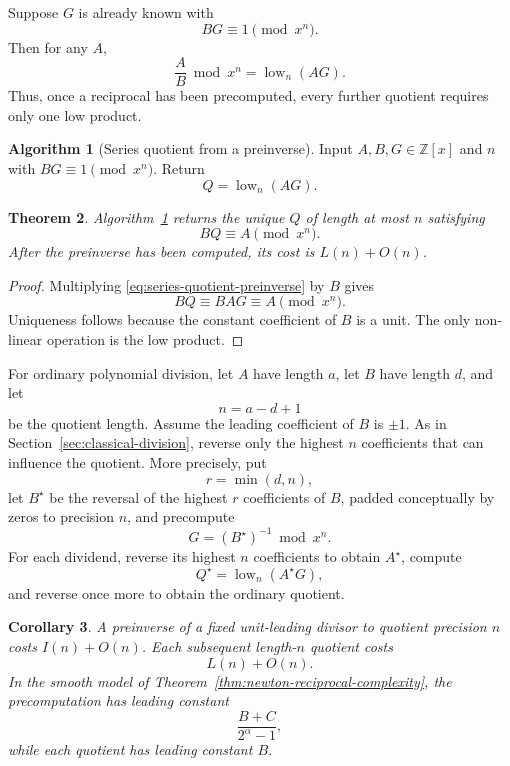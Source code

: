 \documentclass[11pt]{book}
\newtheorem{theorem}{Theorem}[section]
\newtheorem{corollary}[theorem]{Corollary}
\theoremstyle{definition}
\newtheorem{algorithm}[theorem]{Algorithm}
\newcommand{\ZZ}{\mathbb Z}
\begin{document}
Suppose $G$ is already known with
\[
 BG\equiv1\pmod{x^n}.
\]
Then for any $A$,
\begin{equation}\label{eq:series-quotient-preinverse}
 \frac AB\bmod x^n
 =\operatorname{low}_n(AG).
\end{equation}
Thus, once a reciprocal has been precomputed, every further quotient requires
only one low product.

\begin{algorithm}[Series quotient from a preinverse]\label{alg:series-preinverse}
Input $A,B,G\in\ZZ[x]$ and $n$ with $BG\equiv1\pmod{x^n}$.
Return
\[
 Q=\operatorname{low}_n(AG).
\]
\end{algorithm}

\begin{theorem}\label{thm:series-preinverse-correctness}
Algorithm~\ref{alg:series-preinverse} returns the unique $Q$ of length at most
$n$ satisfying
\[
 BQ\equiv A\pmod{x^n}.
\]
After the preinverse has been computed, its cost is $L(n)+O(n)$.
\end{theorem}

\begin{proof}
Multiplying \eqref{eq:series-quotient-preinverse} by $B$ gives
\[
 BQ\equiv BAG\equiv A\pmod{x^n}.
\]
Uniqueness follows because the constant coefficient of $B$ is a unit.  The
only non-linear operation is the low product.
\end{proof}

For ordinary polynomial division, let $A$ have length $a$, let $B$ have length
$d$, and let
\[
 n=a-d+1
\]
be the quotient length.  Assume the leading coefficient of $B$ is $\pm1$.
As in Section~\ref{sec:classical-division}, reverse only the highest $n$
coefficients that can influence the quotient.  More precisely, put
\[
 r=\min(d,n),
\]
let $B^\star$ be the reversal of the highest $r$ coefficients of $B$, padded
conceptually by zeros to precision $n$, and precompute
\[
 G=(B^\star)^{-1}\bmod x^n.
\]
For each dividend, reverse its highest $n$ coefficients to obtain $A^\star$,
compute
\[
 Q^\star=\operatorname{low}_n(A^\star G),
\]
and reverse once more to obtain the ordinary quotient.

\begin{corollary}\label{cor:ordinary-preinverse}
A preinverse of a fixed unit-leading divisor to quotient precision $n$ costs
$I(n)+O(n)$.  Each subsequent length-$n$ quotient costs
\[
 L(n)+O(n).
\]
In the smooth model of Theorem~\ref{thm:newton-reciprocal-complexity}, the
precomputation has leading constant
\[
 \frac{B+C}{2^\alpha-1},
\]
while each quotient has leading constant $B$.
\end{corollary}
\end{document}
